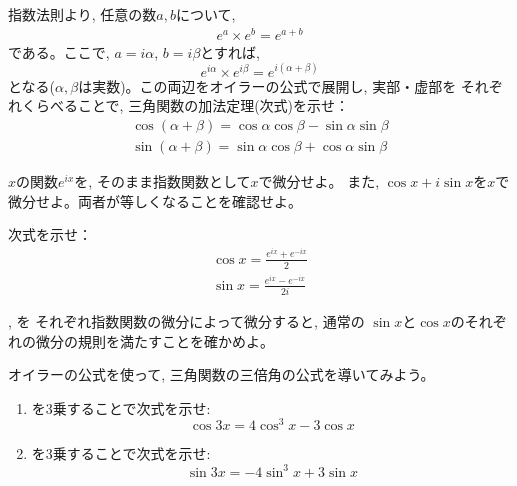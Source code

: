 \begin{q}\label{q:univ_Euler2} 指数法則より, 任意の数$a, b$について, 
\begin{eqnarray}e^a \times e^b = e^{a+b}\end{eqnarray}
である。ここで, $a=i\alpha$, $b=i\beta$とすれば, 
\begin{equation}
e^{i\alpha} \times e^{i\beta} = e^{i(\alpha + \beta)}
\end{equation}
となる($\alpha, \beta$は実数)。この両辺をオイラーの公式で展開し, 実部・虚部を
それぞれくらべることで, 三角関数の加法定理(次式)を示せ：
\begin{eqnarray}
\cos(\alpha+\beta)=\cos\alpha\cos\beta-\sin\alpha\sin\beta\\
\sin(\alpha+\beta)=\sin\alpha\cos\beta+\cos\alpha\sin\beta
\end{eqnarray}
\end{q}
\hv

\begin{q}\label{q:univ_Euler4} $x$の関数$e^{ix}$を, そのまま指数関数として$x$で微分せよ。
また, $\cos x+i\sin x$を$x$で微分せよ。両者が等しくなることを確認せよ。
\end{q}\vspace{0.3cm}

\begin{q}\label{q:univ_Euler6} 次式を示せ：
\begin{eqnarray}
\cos x=\frac{e^{ix}+e^{-ix}}{2}\label{eq:trigon_imag_cos}\\
\sin x=\frac{e^{ix}-e^{-ix}}{2i}\label{eq:trigon_imag_sin}
\end{eqnarray}
\end{q}\vspace{0.3cm}

\begin{q}\label{q:univ_Euler8} , を
それぞれ指数関数の微分によって微分すると, 通常の
$\sin x$と$\cos x$のそれぞれの微分の規則を満たすことを確かめよ。
\end{q}\vspace{0.3cm}

\begin{q}\label{q:univ_Euler9} オイラーの公式を使って, 三角関数の三倍角の公式を導いてみよう。
\begin{enumerate}
\item {}を3乗することで次式を示せ:
\begin{equation}
\cos 3x=4\cos^3 x - 3\cos x
\end{equation}
\item {}を3乗することで次式を示せ:
\begin{equation}
\sin 3x=-4\sin^3 x + 3\sin x
\end{equation}
\end{enumerate}\end{q}
\hv


